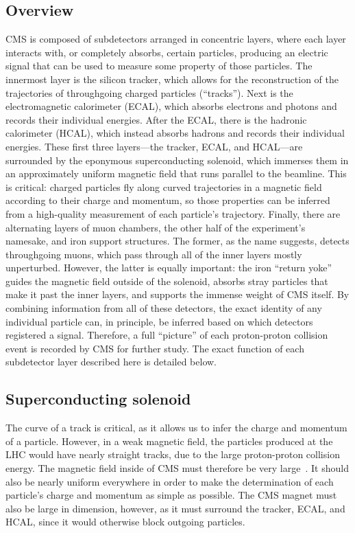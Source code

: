 \subsection{Overview}
CMS is composed of subdetectors arranged in concentric layers, where each layer interacts with, or completely absorbs, certain particles, producing an electric signal that can be used to measure some property of those particles. 
The innermost layer is the silicon tracker, which allows for the reconstruction of the trajectories of throughgoing charged particles (``tracks''). 
Next is the electromagnetic calorimeter (ECAL), which absorbs electrons and photons and records their individual energies. 
After the ECAL, there is the hadronic calorimeter (HCAL), which instead absorbs hadrons and records their individual energies. 
These first three layers---the tracker, ECAL, and HCAL---are surrounded by the eponymous superconducting solenoid, which immerses them in an approximately uniform magnetic field that runs parallel to the beamline. 
This is critical: charged particles fly along curved trajectories in a magnetic field according to their charge and momentum, so those properties can be inferred from a high-quality measurement of each particle's trajectory. 
Finally, there are alternating layers of muon chambers, the other half of the experiment's namesake, and iron support structures. 
The former, as the name suggests, detects throughgoing muons, which pass through all of the inner layers mostly unperturbed.
However, the latter is equally important: the iron ``return yoke'' guides the magnetic field outside of the solenoid, absorbs stray particles that make it past the inner layers, and supports the immense weight of CMS itself. 
By combining information from all of these detectors, the exact identity of any individual particle can, in principle, be inferred based on which detectors registered a signal. 
Therefore, a full ``picture'' of each proton-proton collision event is recorded by CMS for further study. 
The exact function of each subdetector layer described here is detailed below.

\subsection{Superconducting solenoid}
The curve of a track is critical, as it allows us to infer the charge and momentum of a particle. 
However, in a weak magnetic field, the particles produced at the LHC would have nearly straight tracks, due to the large proton-proton collision energy. 
The magnetic field inside of CMS must therefore be very large~\cite{CMSWebMagnet}. 
It should also be nearly uniform everywhere in order to make the determination of each particle's charge and momentum as simple as possible. 
The CMS magnet must also be large in dimension, however, as it must surround the tracker, ECAL, and HCAL, since it would otherwise block outgoing particles. 

